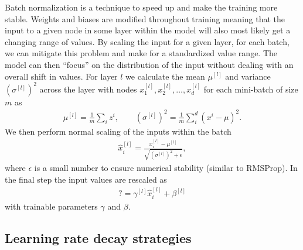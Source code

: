Batch normalization is a technique to speed up and make the training more stable. Weights and biases are modified throughout training meaning that the input to a given node in some layer within the model will also most likely get a changing range of values. By scaling the input for a given layer, for each batch, we can mitigate this problem and make for a standardized value range. The model can then ``focus'' on the distribution of the input without dealing with an overall shift in values. For layer $l$ we calculate the mean $\mu^{[l]}$ and variance $(\sigma^{[l]})^2$ across the layer with nodes $x_1^{[l]}, x_2^{[l]}, \ldots, x_d^{[l]}$ for each mini-batch of size $m$ as
\begin{align*}
  \mu^{[l]} = \frac{1}{m} \sum_i z^i, \qquad (\sigma^{[l]})^2 = \frac{1}{m} \sum_i^d (x^i-\mu)^2.
\end{align*}
We then perform normal scaling of the inputs within the batch
\begin{align*}
  \hat{x}_i^{[l]} = \frac{x_i^{[l]} - \mu^{[l]}}{\sqrt{(\sigma^{[l]})^2 + \epsilon}},
\end{align*}
where $\epsilon$ is a small number to ensure numerical stability (similar to RMSProp). In the final step the input values are rescaled as
\begin{align*}
  ? = \gamma^{[l]} \hat{x}_i^{[l]} + \beta^{[l]}
\end{align*}
with trainable parameters $\gamma$ and $\beta$. 


\subsection{Learning rate decay strategies}

